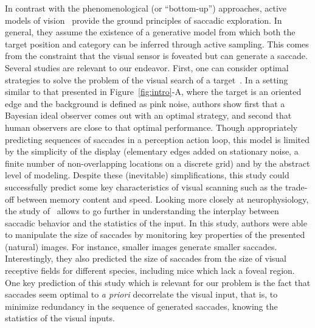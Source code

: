 In contrast with the phenomenological (or ``bottom-up'') approaches, active models of vision~\cite{Najemnik05,Butko2010infomax,dauce2018active} provide the ground principles of saccadic exploration. In general, they assume the existence of a generative model from which both the target position and category can be inferred through active sampling. This comes from the constraint that the visual sensor is foveated but can generate a saccade.
Several studies are relevant to our endeavor. First, one can consider optimal strategies to solve the problem of the visual search of a target~\cite{Najemnik05}. In a setting similar to that presented in Figure~\ref{fig:intro}-A, where the target is an oriented edge and the background is defined as pink noise, authors show first that a Bayesian ideal observer comes out with an optimal strategy, and second that human observers are close to that optimal performance. Though appropriately predicting sequences of saccades in a perception action loop, this model is limited by the simplicity of the display (elementary edges added on stationary noise, a finite number of non-overlapping locations on a discrete grid) and by the abstract level of modeling. Despite these (inevitable) simplifications, this study could successfully predict some key characteristics of visual scanning such as the trade-off between memory content and speed. Looking more closely at neurophysiology, the study of~\cite{Samonds18} allows to go further in understanding the interplay between saccadic behavior and the statistics of the input. In this study, authors were able to manipulate the size of saccades by monitoring key properties of the presented (natural) images. For instance, smaller images generate smaller saccades. Interestingly, they also predicted the size of saccades from the size of visual receptive fields for different species, including mice which lack a foveal region. One key prediction of this study which is relevant for our problem is the fact that saccades seem optimal to \emph{a priori} decorrelate the visual input, that is, to minimize redundancy in the sequence of generated saccades, knowing the statistics of the visual inputs.


